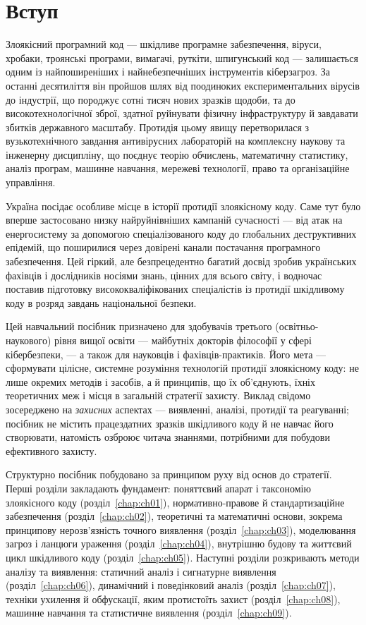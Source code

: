 \chapter*{Вступ}

Злоякісний програмний код --- шкідливе програмне забезпечення, віруси, хробаки, троянські програми, вимагачі, руткіти, шпигунський код --- залишається одним із найпоширеніших і найнебезпечніших інструментів кіберзагроз. За останні десятиліття він пройшов шлях від поодиноких експериментальних вірусів до індустрії, що породжує сотні тисяч нових зразків щодоби, та до високотехнологічної зброї, здатної руйнувати фізичну інфраструктуру й завдавати збитків державного масштабу. Протидія цьому явищу перетворилася з вузькотехнічного завдання антивірусних лабораторій на комплексну наукову та інженерну дисципліну, що поєднує теорію обчислень, математичну статистику, аналіз програм, машинне навчання, мережеві технології, право та організаційне управління.

Україна посідає особливе місце в історії протидії злоякісному коду. Саме тут було вперше застосовано низку найруйнівніших кампаній сучасності --- від атак на енергосистему за допомогою спеціалізованого коду до глобальних деструктивних епідемій, що поширилися через довірені канали постачання програмного забезпечення. Цей гіркий, але безпрецедентно багатий досвід зробив українських фахівців і дослідників носіями знань, цінних для всього світу, і водночас поставив підготовку висококваліфікованих спеціалістів із протидії шкідливому коду в розряд завдань національної безпеки.

Цей навчальний посібник призначено для здобувачів третього (освітньо-наукового) рівня вищої освіти --- майбутніх докторів філософії у сфері кібербезпеки, --- а також для науковців і фахівців-практиків. Його мета --- сформувати цілісне, системне розуміння технологій протидії злоякісному коду: не лише окремих методів і засобів, а й принципів, що їх об'єднують, їхніх теоретичних меж і місця в загальній стратегії захисту. Виклад свідомо зосереджено на \emph{захисних} аспектах --- виявленні, аналізі, протидії та реагуванні; посібник не містить працездатних зразків шкідливого коду й не навчає його створювати, натомість озброює читача знаннями, потрібними для побудови ефективного захисту.

Структурно посібник побудовано за принципом руху від основ до стратегії. Перші розділи закладають фундамент: поняттєвий апарат і таксономію злоякісного коду (розділ~\ref{chap:ch01}), нормативно-правове й стандартизаційне забезпечення (розділ~\ref{chap:ch02}), теоретичні та математичні основи, зокрема принципову нерозв'язність точного виявлення (розділ~\ref{chap:ch03}), моделювання загроз і ланцюги ураження (розділ~\ref{chap:ch04}), внутрішню будову та життєвий цикл шкідливого коду (розділ~\ref{chap:ch05}). Наступні розділи розкривають методи аналізу та виявлення: статичний аналіз і сигнатурне виявлення (розділ~\ref{chap:ch06}), динамічний і поведінковий аналіз (розділ~\ref{chap:ch07}), техніки ухилення й обфускації, яким протистоїть захист (розділ~\ref{chap:ch08}), машинне навчання та статистичне виявлення (розділ~\ref{chap:ch09}).

